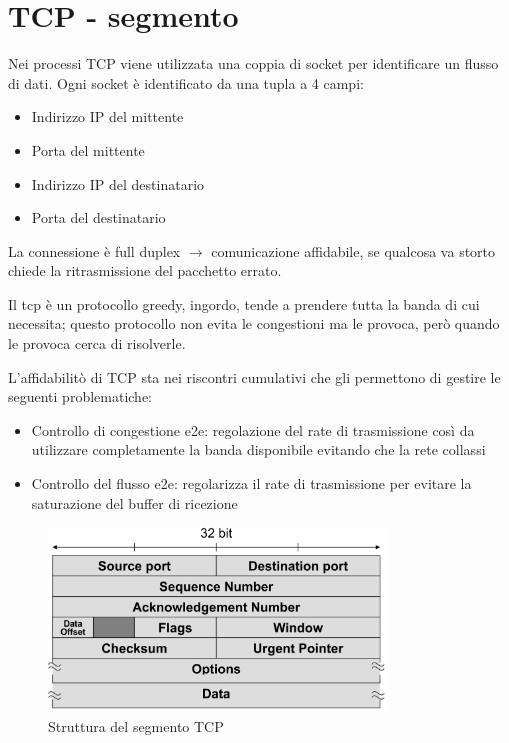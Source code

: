 \newpage
\section{TCP - segmento}
Nei processi TCP viene utilizzata una coppia di socket per identificare un flusso di dati. Ogni socket è identificato da una tupla a 4 campi:
\begin{itemize}
    \item Indirizzo IP del mittente
    \item Porta del mittente
    \item Indirizzo IP del destinatario
    \item Porta del destinatario
\end{itemize}

La connessione è full duplex $\rightarrow$ comunicazione affidabile, se qualcosa va storto chiede la ritrasmissione del pacchetto errato.

Il tcp è un protocollo greedy, ingordo, tende a prendere tutta la banda di cui necessita; questo protocollo non evita le congestioni ma le provoca, però quando le provoca cerca di risolverle.

L'affidabilitò di TCP sta nei riscontri cumulativi che gli permettono di gestire le seguenti problematiche:
\begin{itemize}
    \item Controllo di congestione e2e: regolazione del rate di trasmissione così da utilizzare completamente la banda disponibile evitando che la rete collassi
    \item Controllo del flusso e2e: regolarizza il rate di trasmissione per evitare la saturazione del buffer di ricezione
\end{itemize}

\begin{figure}[h!]
    \centering
    \includegraphics[width=0.8\textwidth]{images/segmento_tcp.png}
    \caption{Struttura del segmento TCP}
    \label{fig:segmentotcp}
\end{figure}

